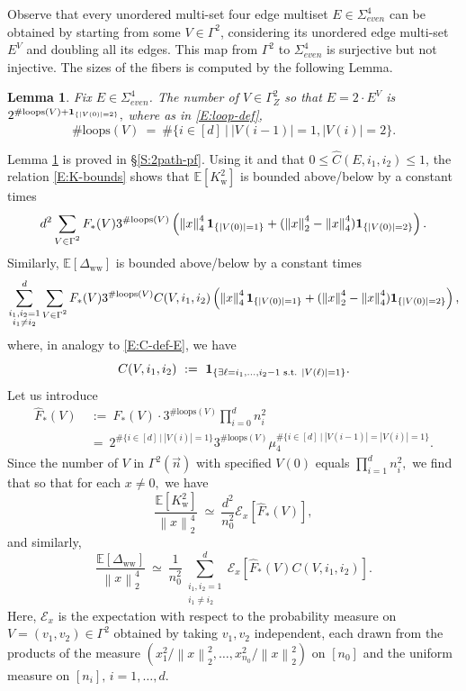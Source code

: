 \documentclass[11pt, reqno]{amsart}
\newtheorem{lemma}[theorem]{Lemma}
\newcommand{\E}[1]{{\mathbb E}\left [#1\right]}
\newcommand{\abs}[1]{\ensuremath{\left| #1 \right|}}
\newcommand{\lr}[1]{\ensuremath{\left(#1 \right)}}
\newcommand{\norm}[1]{\left\lVert#1\right\rVert}
\newcommand{\set}[1]{\ensuremath{\{#1\}}}
\newcommand{\Kw}{K_{\mathrm{w}}}
\newcommand{\Dww}{\Delta_{\mathrm{ww}}}
\begin{document}
Observe that every unordered multi-set four edge multiset $E\in \Sigma_{even}^4$ can be obtained by starting from some $V\in \Gamma^2$, considering its unordered edge multi-set $E^V$ and doubling all its  edges. This map from $\Gamma^2$ to $\Sigma_{even}^4$ is surjective but not injective. The sizes of the fibers is computed by the following Lemma.
\begin{lemma}\label{L:2paths}
Fix  $E\in \Sigma_{even}^4$. The number of $V\in \Gamma_Z^2$ so that $E=2\cdot E^V$ is $2^{\#\text{loops}(V)+{\bf 1}_{\set{\abs{V(0)}=2}}},$ where as in \eqref{E:loop-def}, 
\[\#\text{loops}(V)~=~\#\set{i\in [d]~|~ \abs{V(i-1)}=1,\abs{V(i)}=2}.\]
\end{lemma}
Lemma \ref{L:2paths} is proved in \S \ref{S:2path-pf}. Using it and that $0\leq \widehat{C}(E,i_1,i_2)\leq 1$, the relation \eqref{E:K-bounds} shows that $\E{\Kw^2}$ is bounded above/below by a constant times
\begin{equation}\label{E:K-bounds-2}
d^2\sum_{\substack{V\in \Gamma^2}} F_*(V) 3^{\#\text{loops}(V)}\lr{\norm{x}_4^4 {\bf 1}_{\set{\abs{V(0)}=1}}+ (\norm{x}_2^4-\norm{x}_4^4) {\bf 1}_{\set{\abs{V(0)}=2}}}.
\end{equation}
Similarly, $\E{\Dww}$ is bounded above/below by a constant times
\begin{equation}\label{E:D-bounds-2}
\sum_{\substack{i_1,i_2=1\\ i_1\neq i_2}}^d\sum_{\substack{V\in \Gamma^2}} F_*(V) 3^{\#\text{loops}(V)}C(V,i_1,i_2)\lr{\norm{x}_4^4 {\bf 1}_{\set{\abs{V(0)}=1}}+ (\norm{x}_2^4-\norm{x}_4^4) {\bf 1}_{\set{\abs{V(0)}=2}}},
\end{equation}
where, in analogy to \eqref{E:C-def-E}, we have
\[C(V,i_1,i_2)~:=~{\bf 1}_{\set{\exists \ell=i_1,\ldots, i_2-1\text{ s.t. } \abs{V(\ell)}=1}}.\]
Let us introduce 
\begin{align*}
  \widehat{F}_*(V)~&:=~ F_*(V)\cdot 3^{\#\text{loops}(V)}\prod_{i=0}^d n_{i}^2\\
~&=~ 2^{\#\set{i\in [d]~|~\abs{V(i)}=1}}3^{\#\text{loops}(V)}  \mu_4^{\#\set{i\in [d]~|~\abs{V(i-1)}=\abs{V(i)}=1}}.
\end{align*}
Since the number of $V$ in $\Gamma^2(\vec{n})$ with specified $V(0)$ equals $\prod_{i=1}^d n_i^2,$ we find that so that for each $x\neq 0,$ we have 
\begin{equation}\label{E:K2-est}
\frac{\E{\Kw^2}}{\norm{x}_2^4}~\simeq~\frac{d^2}{n_0^2}\mathcal E_x\left[\widehat{F}_*(V)\right],
\end{equation}
and similarly, 
\[\frac{\E{\Dww}}{\norm{x}_2^4}~\simeq~\frac{1}{n_0^2}\sum_{\substack{i_1,i_2=1\\ i_1\neq i_2}}^d\mathcal E_x\left[\widehat{F}_*(V)C(V,i_1,i_2)\right].\]
Here, $\mathcal E_x$ is the expectation with respect to the probability measure on $V=(v_1,v_2)\in\Gamma^2$ obtained by taking $v_1,v_2$ independent, each drawn from the products of the measure $\lr{x_1^2/\norm{x}_2^2,\ldots, x_{n_0}^2/\norm{x}_2^2}$ on $[n_0]$ and the uniform measure on $[n_i],\, i=1,\ldots, d.$
\end{document}
